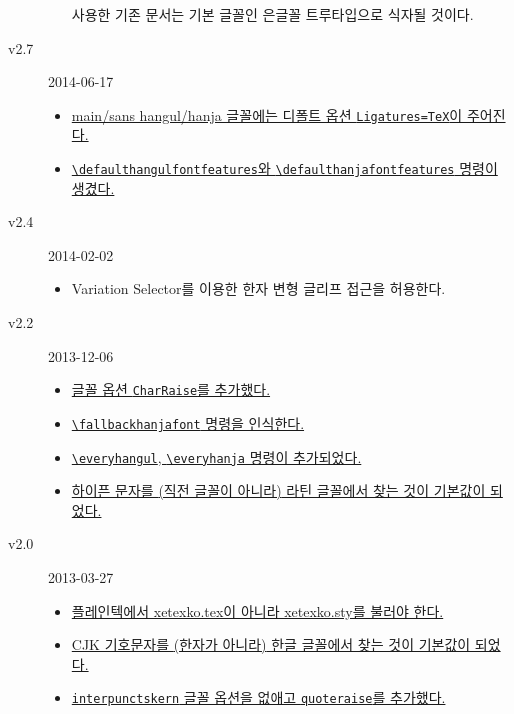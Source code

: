 \documentclass[a4paper]{article}
\def\cs#1{\texttt{\textbackslash #1}}
\def\hparen#1{{\small\hangulparens(#1)}}
\begin{document}
\begin{small}
\begin{description}
\begin{itemize}
          사용한 기존 문서는 기본 글꼴인 은글꼴 트루타입으로 식자될 것이다.
      \end{itemize}
    \item[v2.7] 2014-06-17
      \begin{itemize}
        \item \hyperref[sec:fontcmds]
          {main/sans hangul/hanja 글꼴에는 디폴트 옵션
          \texttt{Ligatures=TeX}이 주어진다.}
        \item \hyperref[sec:fontopts]
          {\cs{defaulthangulfontfeatures}와 \cs{defaulthanjafontfeatures}
          명령이 생겼다.}
      \end{itemize}
    \item[v2.4] 2014-02-02
      \begin{itemize}
        \item Variation Selector를 이용한 한자 변형 글리프 접근을 허용한다.
      \end{itemize}
    \item[v2.2] 2013-12-06
      \begin{itemize}
        \item \hyperref[sec:fontopts]
          {글꼴 옵션 \texttt{CharRaise}를 추가했다.}
        \item \hyperref[sec:fontcmds]
          {\cs{fallbackhanjafont} 명령을 인식한다.}
        \item \hyperref[sec:etccmds]
          {\cs{everyhangul}, \cs{everyhanja} 명령이 추가되었다.}
        \item \hyperref[sec:symbolfont]
          {하이픈 문자를 \hparen{직전 글꼴이 아니라} 라틴 글꼴에서 찾는
          것이 기본값이 되었다.}
      \end{itemize}
    \item[v2.0] 2013-03-27
      \begin{itemize}
        \item \hyperref[sec:loading]
          {플레인텍에서 xetexko.tex이 아니라 xetexko.sty를 불러야 한다.}
        \item \hyperref[sec:symbolfont]
          {CJK 기호문자를 \hparen{한자가 아니라} 한글 글꼴에서 찾는 것이
          기본값이 되었다.}
        \item \hyperref[sec:fontopts]
          {\texttt{interpunctskern} 글꼴 옵션을 없애고 \texttt{quoteraise}를
          추가했다.}
      \end{itemize}
  \end{description}
\end{small}
\end{document}
